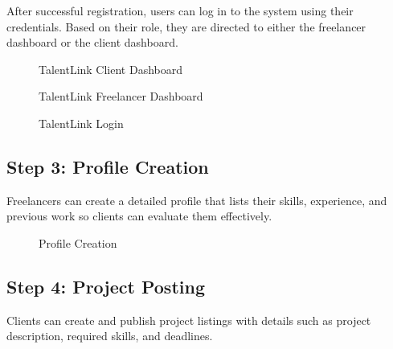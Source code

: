 \documentclass[12pt,a4paper,oneside]{report}
\numberwithin{figure}{chapter}
\numberwithin{table}{chapter}
\begin{document}
After successful registration, users can log in to the system using their credentials.
Based on their role, they are directed to either the freelancer dashboard or the client
dashboard.

\begin{figure}[H]
  \centering
  \caption{TalentLink Client Dashboard}
  \label{fig:client_dash}
\end{figure}

\begin{figure}[H]
  \centering
  \caption{TalentLink Freelancer Dashboard}
  \label{fig:freelancer_dash}
\end{figure}

\begin{figure}[H]
  \centering
  \caption{TalentLink Login}
  \label{fig:login}
\end{figure}

\subsection{Step 3: Profile Creation}

Freelancers can create a detailed profile that lists their skills, experience, and
previous work so clients can evaluate them effectively.

\begin{figure}[H]
  \centering
  \caption{Profile Creation}
  \label{fig:profile}
\end{figure}

\subsection{Step 4: Project Posting}

Clients can create and publish project listings with details such as project description,
required skills, and deadlines.
\end{document}

